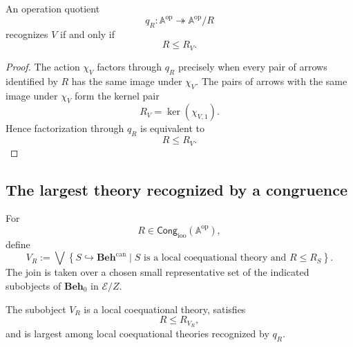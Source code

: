 \begin{lemma}
\label{lem:to-operation-quotient-recognition-criterion}
    An operation quotient
    \[
        q_R:
        \mathbb A^{\mathrm{op}}
        \twoheadrightarrow
        \mathbb A^{\mathrm{op}}/R
    \]
    recognizes \(V\) if and only if
    \[
        R\leq R_V.
    \]
\end{lemma}

\begin{proof}
    The action \(\chi_V\) factors through \(q_R\) precisely when every pair of
    arrows identified by \(R\) has the same image under \(\chi_V\). The pairs
    of arrows with the same image under \(\chi_V\) form the kernel pair
    \[
        R_V=\ker(\chi_{V,1}).
    \]
    Hence factorization through \(q_R\) is equivalent to
    \[
        R\leq R_V.
    \]
\end{proof}

\subsection{The largest theory recognized by a congruence}
\label{subsec:to-largest-recognized-theory}

\begin{definition}
\label{def:to-theory-recognized-by-congruence}
    For
    \[
        R\in
        \mathsf{Cong}_{\mathrm{ioo}}(\mathbb A^{\mathrm{op}}),
    \]
    define
    \[
        V_R
        :=
        \bigvee
        \left\{
            S\hookrightarrow\mathbf{Beh}^{\mathrm{can}}
            \mid
            S \text{ is a local coequational theory and } R\leq R_S
        \right\}.
    \]
    The join is taken over a chosen small representative set of the indicated
    subobjects of \(\mathbf{Beh}_0\) in \(\mathcal E/Z\).
\end{definition}

\begin{proposition}
\label{prop:to-largest-recognized-theory}
    The subobject \(V_R\) is a local coequational theory, satisfies
    \[
        R\leq R_{V_R},
    \]
    and is largest among local coequational theories recognized by \(q_R\).
\end{proposition}


